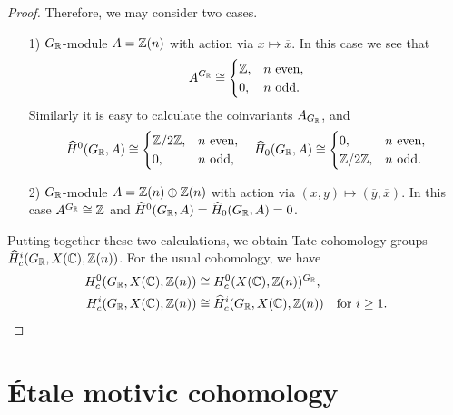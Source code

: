 \documentclass[draft]{article}
\numberwithin{equation}{section}
\begin{document}
\begin{proposition}
\begin{proof}
    Therefore, we may consider two cases.
    \begin{enumerate}
    \item[1)] $G_{\mathbb{R}}$-module $A = \mathbb{Z} (n)$ with action via
      $x \mapsto \overline{x}$.  In this case we see that
      \[ A^{G_{\mathbb{R}}} \cong
        \begin{cases}
          \mathbb{Z}, & n\text{ even}, \\
          0, & n\text{ odd}.
        \end{cases} \]
      Similarly it is easy to calculate the coinvariants $A_{G_{\mathbb{R}}}$, and
      \[ \widehat{H}^0 (G_{\mathbb{R}}, A) \cong
        \begin{cases}
          \mathbb{Z}/2\mathbb{Z}, & n\text{ even},\\
          0, & n\text{ odd},
        \end{cases} \quad
        \widehat{H}_0 (G_{\mathbb{R}}, A) \cong
        \begin{cases}
          0, & n\text{ even},\\
          \mathbb{Z}/2\mathbb{Z}, & n\text{ odd}.
        \end{cases} \]

    \item[2)] $G_{\mathbb{R}}$-module $A = \mathbb{Z} (n) \oplus \mathbb{Z} (n)$ with action via
      $(x,y) \mapsto (\overline{y}, \overline{x})$. In this case
      $A^{G_{\mathbb{R}}} \cong \mathbb{Z}$ and
      $\widehat{H}^0 (G_{\mathbb{R}},A) = \widehat{H}_0 (G_{\mathbb{R}},A) = 0$.
    \end{enumerate}

    Putting together these two calculations, we obtain Tate cohomology groups
    $\widehat{H}^i_c (G_{\mathbb{R}}, X(\mathbb{C}), \mathbb{Z} (n))$. For the usual cohomology, we
    have
    \begin{align*}
      H^0_c (G_{\mathbb{R}}, X(\mathbb{C}), \mathbb{Z} (n)) & \cong H^0_c (X(\mathbb{C}), \mathbb{Z} (n))^{G_{\mathbb{R}}}, \\
      H^i_c (G_{\mathbb{R}}, X(\mathbb{C}), \mathbb{Z} (n)) & \cong \widehat{H}^i_c (G_{\mathbb{R}}, X(\mathbb{C}), \mathbb{Z} (n)) \quad \text{for }i \ge 1. \qedhere
    \end{align*}
  \end{proof}
\end{proposition}


\section{\'{E}tale motivic cohomology}
\label{sec:motivic-cohomology-structure}
\end{document}
